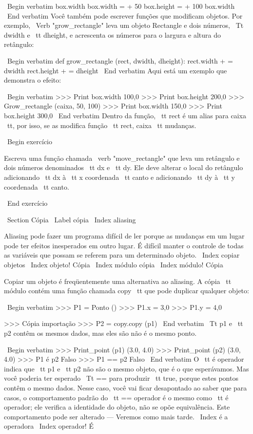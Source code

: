\documentclass[10pt]{book}
\begin{document}
\begin {itemize}
{{{{{{{{{{{{{\ Begin {verbatim}
box.width box.width = + 50
box.height = + 100 box.width
\ End {verbatim}
%
Você também pode escrever funções que modificam objetos. Por exemplo,
\ Verb "grow_rectangle" leva um objeto Rectangle e dois números,
{\ Tt dwidth} e {\ tt dheight}, e acrescenta os números para o
largura e altura do retângulo:

\ Begin {verbatim}
def grow_rectangle (rect, dwidth, dheight):
    rect.width + = dwidth
    rect.height + = dheight
\ End {verbatim}
%
Aqui está um exemplo que demonstra o efeito:

\ Begin {verbatim}
>>> Print box.width
100,0
>>> Print box.height
200,0
>>> Grow_rectangle (caixa, 50, 100)
>>> Print box.width
150,0
>>> Print box.height
300,0
\ End {verbatim}
%
Dentro da função, {\ tt rect} é um
alias para {caixa \ tt}, por isso, se as modifica função {\ tt rect}, 
{caixa \ tt} mudanças.

\ Begin {} exercício

Escreva uma função chamada \ verb "move_rectangle" que leva
um retângulo e dois números denominados {\ tt dx} e {\ tt dy}. Ele
deve alterar o local do retângulo adicionando {\ tt dx}
à {\ tt x} coordenada {\ tt canto} e adicionando {\ tt dy}
à {\ tt y} coordenada {\ tt canto}.

\ End {} exercício


\ Section {Cópia}
\ Label {cópia}
\ Index {aliasing}

Aliasing pode fazer um programa difícil de ler porque as mudanças
em um lugar pode ter efeitos inesperados em outro lugar.
É difícil manter o controle de todas as variáveis ​​que possam se referem
para um determinado objeto.
\ Index {copiar objetos}
\ Index {objeto! Cópia}
\ Index {módulo cópia}
\ Index {módulo! Cópia}

Copiar um objeto é freqüentemente uma alternativa ao aliasing.
A cópia {\ tt} módulo contém uma função chamada {copy \ tt} que
pode duplicar qualquer objeto:

\ Begin {verbatim}
>>> P1 = Ponto ()
>>> P1.x = 3,0
>>> P1.y = 4,0

>>> Cópia importação
>>> P2 = copy.copy (p1)
\ End {verbatim}
%
{\ Tt p1} e {\ tt p2} contêm os mesmos dados, mas eles são
não é o mesmo ponto.

\ Begin {verbatim}
>>> Print_point (p1)
(3.0, 4.0)
>>> Print_point (p2)
(3.0, 4.0)
>>> P1 é p2
Falso
>>> P1 == p2
Falso
\ End {verbatim}
%
O {\ tt é} operador indica que {\ tt p1} e {\ tt p2} não são o
mesmo objeto, que é o que esperávamos. Mas você poderia ter esperado
{\ Tt ==} para produzir {\ tt true}, porque estes pontos contêm o mesmo
dados. Nesse caso, você vai ficar desapontado ao saber que para
casos, o comportamento padrão do {\ tt ==} operador é o mesmo
como {\ tt é} operador; ele verifica a identidade do objeto, não se opõe
equivalência. Este comportamento pode ser alterado --- Veremos como mais tarde.
\ Index {} é a operadora
\ Index {operador! É}

}}}}}}}}}}}}}
\end{itemize}
\end{document}
